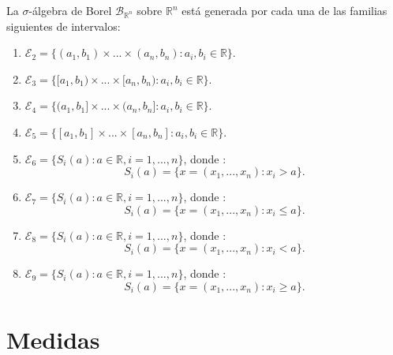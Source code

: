 \begin{prop}
    La $\sigma$-álgebra de Borel $\mathcal{B}_{\mathbb{R}^n}$ sobre $\mathbb{R}^n$ está generada por cada una de las familias siguientes de intervalos:
    \begin{enumerate}
        \item[(a)] $\mathcal{E}_2 = \{(a_1,b_1) \times ... \times (a_n,b_n) : a_i,b_i \in \mathbb{R} \}$.
        \item[(b)] $\mathcal{E}_3 = \{[a_1,b_1) \times ... \times [a_n,b_n) : a_i,b_i \in \mathbb{R} \}$.
        \item[(c)] $\mathcal{E}_4 = \{(a_1,b_1] \times ... \times (a_n,b_n] : a_i,b_i \in \mathbb{R} \}$.
        \item[(d)] $\mathcal{E}_5 = \{[a_1,b_1] \times ... \times [a_n,b_n] : a_i,b_i \in \mathbb{R} \}$.
        \item[(e)] $\mathcal{E}_6 = \{ S_i(a) : a \in \mathbb{R}, i = 1,..., n \} $, donde :
              $$S_i(a) = \{ x = (x_1, ..., x_n) : x_i > a \}.$$
        \item[(f)] $\mathcal{E}_7 = \{ S_i(a) : a \in \mathbb{R}, i = 1,..., n \} $, donde :
              $$S_i(a) = \{ x = (x_1, ..., x_n) : x_i \leq a \}.$$
        \item[(g)] $\mathcal{E}_8 = \{ S_i(a) : a \in \mathbb{R}, i = 1,..., n \} $, donde :
              $$S_i(a) = \{ x = (x_1, ..., x_n) : x_i < a \}.$$
        \item[(h)] $\mathcal{E}_9 = \{ S_i(a) : a \in \mathbb{R}, i = 1,..., n \} $, donde :
              $$S_i(a) = \{ x = (x_1, ..., x_n) : x_i \ge a \}.$$
    \end{enumerate}
\end{prop}
\section{Medidas}
